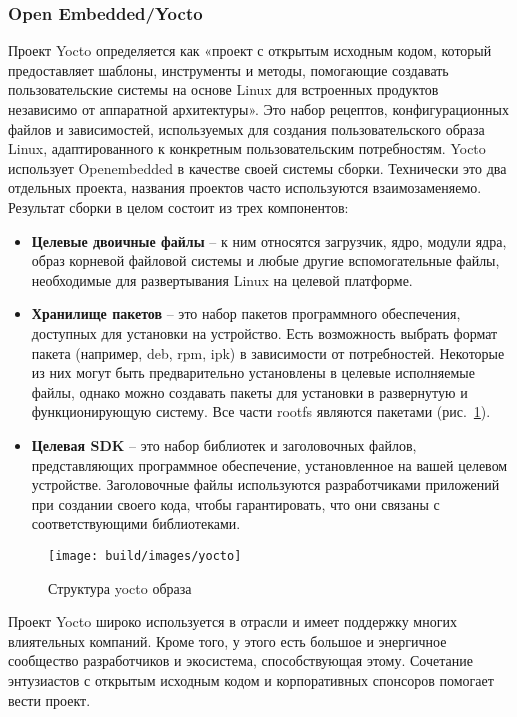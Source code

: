 \subsubsection{Open Embedded/Yocto}
Проект Yocto определяется как «проект с открытым исходным кодом, который предоставляет шаблоны, инструменты и методы, помогающие создавать пользовательские системы на основе Linux для встроенных продуктов независимо от аппаратной архитектуры»\cite{YOCTO}.
Это набор рецептов, конфигурационных файлов и зависимостей, используемых для создания пользовательского образа Linux, адаптированного к конкретным пользовательским потребностям.
Yocto использует Openembedded в качестве своей системы сборки.
Технически это два отдельных проекта, названия проектов часто используются взаимозаменяемо.
Результат сборки в целом состоит из трех компонентов:
\begin{itemize}
  \item \textbf{Целевые двоичные файлы} -- к ним относятся загрузчик, ядро, модули ядра, образ корневой файловой системы и любые другие вспомогательные файлы, необходимые для развертывания Linux на целевой платформе.
  \item \textbf{Хранилище пакетов} -- это набор пакетов программного обеспечения, доступных для установки на устройство.
Есть возможность выбрать формат пакета (например, deb, rpm, ipk) в зависимости от потребностей.
Некоторые из них могут быть предварительно установлены в целевые исполняемые файлы, однако можно создавать пакеты для установки в развернутую и функционирующую систему.
Все части rootfs являются пакетами (рис.~\ref{fig: yocto}).
  \item \textbf{Целевая SDK} --  это набор библиотек и заголовочных файлов, представляющих программное обеспечение, установленное на вашей целевом устройстве.
Заголовочные файлы используются разработчиками приложений при создании своего кода, чтобы гарантировать, что они связаны с соответствующими библиотеками.
\end{itemize}

\begin{figure}[h!]
  \centering
  \setlength{\fboxsep}{5pt}
  \texttt{[image: build/images/yocto]}
  \caption{Структура yocto образа}\label{fig: yocto}
\end{figure}

Проект Yocto широко используется в отрасли и имеет поддержку многих влиятельных компаний. Кроме того, у этого есть большое и энергичное сообщество разработчиков и экосистема, способствующая этому. Сочетание энтузиастов с открытым исходным кодом и корпоративных спонсоров помогает вести проект\cite{YOCTO}.

